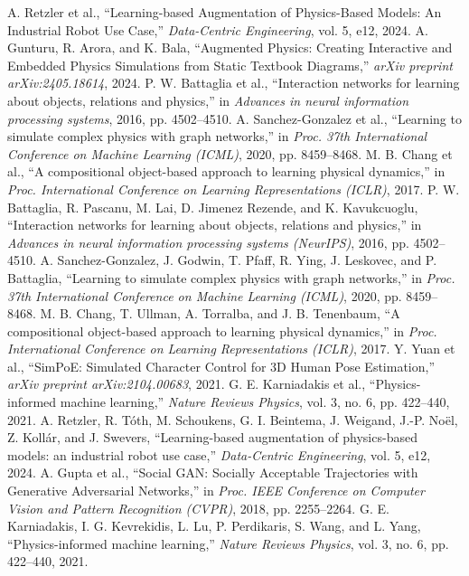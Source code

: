 \documentclass[conference]{IEEEtran}
\begin{document}
\begin{thebibliography}{00}
 A. Retzler et al., ``Learning-based Augmentation of Physics-Based Models: An Industrial Robot Use Case,'' \textit{Data-Centric Engineering}, vol. 5, e12, 2024.
 A. Gunturu, R. Arora, and K. Bala, ``Augmented Physics: Creating Interactive and Embedded Physics Simulations from Static Textbook Diagrams,'' \textit{arXiv preprint arXiv:2405.18614}, 2024.
 P. W. Battaglia et al., ``Interaction networks for learning about objects, relations and physics,'' in \textit{Advances in neural information processing systems}, 2016, pp. 4502--4510.
 A. Sanchez-Gonzalez et al., ``Learning to simulate complex physics with graph networks,'' in \textit{Proc. 37th International Conference on Machine Learning (ICML)}, 2020, pp. 8459--8468.
 M. B. Chang et al., ``A compositional object-based approach to learning physical dynamics,'' in \textit{Proc. International Conference on Learning Representations (ICLR)}, 2017.
 P. W. Battaglia, R. Pascanu, M. Lai, D. Jimenez Rezende, and K. Kavukcuoglu, ``Interaction networks for learning about objects, relations and physics,'' in \textit{Advances in neural information processing systems (NeurIPS)}, 2016, pp. 4502--4510.
 A. Sanchez-Gonzalez, J. Godwin, T. Pfaff, R. Ying, J. Leskovec, and P. Battaglia, ``Learning to simulate complex physics with graph networks,'' in \textit{Proc. 37th International Conference on Machine Learning (ICML)}, 2020, pp. 8459--8468.
 M. B. Chang, T. Ullman, A. Torralba, and J. B. Tenenbaum, ``A compositional object-based approach to learning physical dynamics,'' in \textit{Proc. International Conference on Learning Representations (ICLR)}, 2017.
 Y. Yuan et al., ``SimPoE: Simulated Character Control for 3D Human Pose Estimation,'' \textit{arXiv preprint arXiv:2104.00683}, 2021.
 G. E. Karniadakis et al., ``Physics-informed machine learning,'' \textit{Nature Reviews Physics}, vol. 3, no. 6, pp. 422--440, 2021.
 A. Retzler, R. Tóth, M. Schoukens, G. I. Beintema, J. Weigand, J.-P. Noël, Z. Kollár, and J. Swevers, ``Learning-based augmentation of physics-based models: an industrial robot use case,'' \textit{Data-Centric Engineering}, vol. 5, e12, 2024.
 A. Gupta et al., ``Social GAN: Socially Acceptable Trajectories with Generative Adversarial Networks,'' in \textit{Proc. IEEE Conference on Computer Vision and Pattern Recognition (CVPR)}, 2018, pp. 2255--2264.
 G. E. Karniadakis, I. G. Kevrekidis, L. Lu, P. Perdikaris, S. Wang, and L. Yang, ``Physics-informed machine learning,'' \textit{Nature Reviews Physics}, vol. 3, no. 6, pp. 422--440, 2021.

\end{thebibliography}
\end{document}
